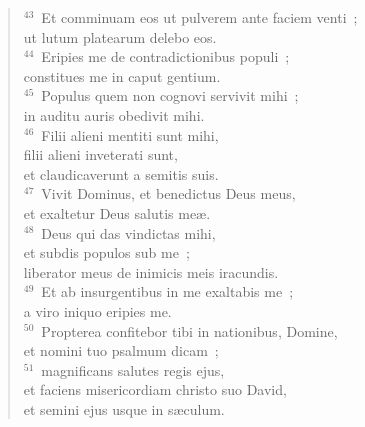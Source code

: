 \begin{verse}
${}^{43}$~Et comminuam eos ut pulverem ante faciem venti~;\\ ut lutum platearum delebo eos.\\
${}^{44}$~Eripies me de contradictionibus populi~;\\ constitues me in caput gentium.\\
${}^{45}$~Populus quem non cognovi servivit mihi~;\\ in auditu auris obedivit mihi.\\
${}^{46}$~Filii alieni mentiti sunt mihi,\\ filii alieni inveterati sunt,\\ et claudicaverunt a semitis suis.\\
${}^{47}$~Vivit Dominus, et benedictus Deus meus,\\ et exaltetur Deus salutis me\ae .\\
${}^{48}$~Deus qui das vindictas mihi,\\ et subdis populos sub me~;\\ liberator meus de inimicis meis iracundis.\\
${}^{49}$~Et ab insurgentibus in me exaltabis me~;\\ a viro iniquo eripies me.\\
${}^{50}$~Propterea confitebor tibi in nationibus, Domine,\\ et nomini tuo psalmum dicam~;\\
${}^{51}$~magnificans salutes regis ejus,\\ et faciens misericordiam christo suo David,\\ et semini ejus usque in s\ae culum.\end{verse}



